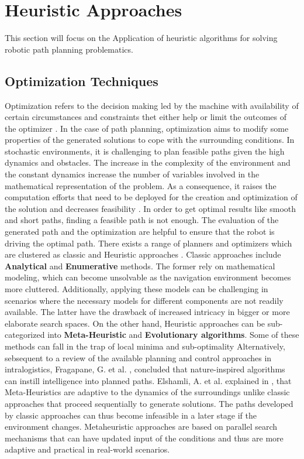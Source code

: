 \newpage

\section{Heuristic Approaches}
This section will focus on the Application of heuristic algorithms for solving robotic path planning 
problematics. 

\subsection{Optimization Techniques}
Optimization refers to the decision making led by the machine with availability of certain circumstances and constraints
thet either help or limit the outcomes of the optimizer \cite{R37}. In the case of path planning, optimization aims
to modify some properties of the generated solutions to cope with the surrounding conditions.
In stochastic environments, it is challenging to plan feasible paths given the high dynamics 
and obstacles.
The increase in the complexity of the environment and the constant dynamics increase the number of variables involved 
in the mathematical representation of the problem. As a consequence, it raises the computation efforts that need to be 
deployed for the creation and optimization of the solution and decreases feasibility \cite{R7}.
In order to get optimal results like smooth and short paths, finding a feasible path is not enough. The evaluation 
of the generated path and the optimization are helpful to ensure that the robot is driving the optimal path.
There exists a range of planners and optimizers which are clustered as classic and Heuristic approaches \cite{R12}.
Classic approaches include \textbf{Analytical} and \textbf{Enumerative} methods. 
The former rely on mathematical modeling, which can become unsolvable as the navigation environment becomes more 
cluttered. Additionally, applying these models can be challenging in scenarios where the necessary models for different 
components are not readily available. The latter have the drawback of increased intricacy in bigger or more elaborate 
search spaces. On the other hand, Heuristic approaches can be sub-categorized into \textbf{Meta-Heuristic} and \textbf{Evolutionary algorithms}.
Some of these methods can fall in the trap of local minima and sub-optimality \cite{R12}
Alternatively, sebsequent to a review of the available planning and control approaches in intralogistics, Fragapane, G. et al. \cite{R7}, 
concluded that nature-inspired algorithms can instill intelligence into planned paths.
Elshamli, A. et al. explained in \cite{R17}, that Meta-Heuristics are adaptive to the dynamics of the surroundings
unlike classic approaches that proceed sequentially to generate solutions. The paths developed by classic approaches
can thus become infeasible in a later stage if the environment changes. Metaheuristic approaches are based 
on parallel search mechanisms that can have updated input of the conditions and thus are more adaptive and 
practical in real-world scenarios.


